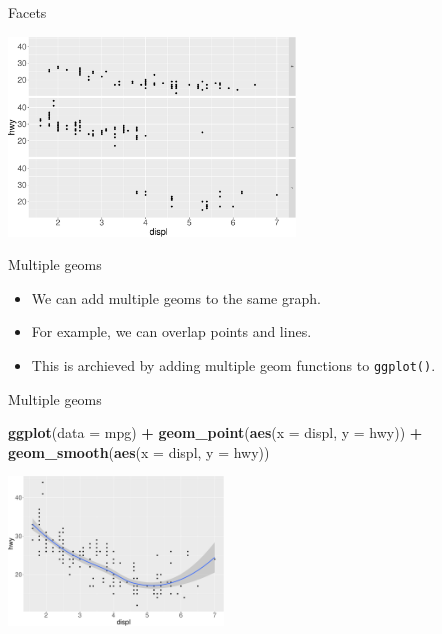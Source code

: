\documentclass[ignorenonframetext,]{beamer}
\newenvironment{Shaded}{\begin{snugshade}}{\end{snugshade}}
\newcommand{\DataTypeTok}[1]{\textcolor[rgb]{0.13,0.29,0.53}{#1}}
\newcommand{\KeywordTok}[1]{\textcolor[rgb]{0.13,0.29,0.53}{\textbf{#1}}}
\newcommand{\NormalTok}[1]{#1}
\newcommand{\OperatorTok}[1]{\textcolor[rgb]{0.81,0.36,0.00}{\textbf{#1}}}
\newcommand{\StringTok}[1]{\textcolor[rgb]{0.31,0.60,0.02}{#1}}
\begin{document}
\begin{frame}{Facets}
\protect\hypertarget{facets-10}{}

\begin{center}\includegraphics[height=200px]{data-visualization_files/figure-beamer/unnamed-chunk-79-1} \end{center}

\end{frame}

\begin{frame}[fragile]{Multiple geoms}
\protect\hypertarget{multiple-geoms}{}

\begin{itemize}
\item
  We can add multiple geoms to the same graph.
\item
  For example, we can overlap points and lines.
\item
  This is archieved by adding multiple geom functions to
  \texttt{ggplot()}.
\end{itemize}

\end{frame}

\begin{frame}[fragile]{Multiple geoms}
\protect\hypertarget{multiple-geoms-1}{}

\begin{Shaded}
\begin{Highlighting}[]
\KeywordTok{ggplot}\NormalTok{(}\DataTypeTok{data =}\NormalTok{ mpg) }\OperatorTok{+}\StringTok{ }
\StringTok{  }\KeywordTok{geom_point}\NormalTok{(}\KeywordTok{aes}\NormalTok{(}\DataTypeTok{x =}\NormalTok{ displ, }\DataTypeTok{y =}\NormalTok{ hwy)) }\OperatorTok{+}
\StringTok{  }\KeywordTok{geom_smooth}\NormalTok{(}\KeywordTok{aes}\NormalTok{(}\DataTypeTok{x =}\NormalTok{ displ, }\DataTypeTok{y =}\NormalTok{ hwy))}
\end{Highlighting}
\end{Shaded}

\begin{center}\includegraphics[height=150px]{data-visualization_files/figure-beamer/unnamed-chunk-80-1} \end{center}

\end{frame}
\end{document}
